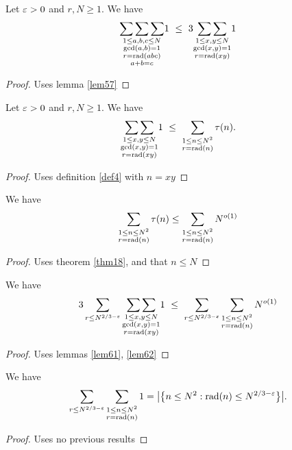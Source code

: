 \begin{lemma} \label{lem60} 
Let $\varepsilon>0$ and $r,N\ge1$. We have
\[
\underset{\substack{1\le a,b,c\le N\\ \gcd(a,b)=1\\ r=\operatorname{rad}(abc) \\ a+b=c}}{\sum\sum\sum} 1
\ \le \ 3\underset{\substack{1\le x,y\le N\\ \gcd(x,y)=1\\r=\operatorname{rad}(xy)}}{\sum\sum} 1
\]
\end{lemma}
\begin{proof}\leanok
{}
Uses lemma \ref{lem57}
\end{proof}

\begin{lemma} \label{lem61} 
Let $\varepsilon>0$ and $r,N\ge1$. We have
\[
\underset{\substack{1\le x,y\le N\\ \gcd(x,y)=1\\r=\operatorname{rad}(xy)}}{\sum\sum} 1 
\ \le \ \sum_{\substack{1\le n\le N^2\\r=\operatorname{rad}(n)}} \tau(n).
\]
\end{lemma}
\begin{proof}\leanok
{}
Uses definition \ref{def4} with $n=xy$
\end{proof}

\begin{lemma} \label{lem62} 
We have
\[
\sum_{\substack{1\le n\le N^2\\r=\operatorname{rad}(n)}} \tau(n)
\le \sum_{\substack{1\le n\le N^2\\r=\operatorname{rad}(n)}} N^{o(1)}
\]
\end{lemma}
\begin{proof}\leanok
{}
Uses theorem \ref{thm18}, and that $n\le N$
\end{proof}

\begin{lemma} \label{lem63} 
We have
\[
3\sum_{r\le N^{2/3-\varepsilon}}\underset{\substack{1\le x,y\le N\\ \gcd(x,y)=1\\r=\operatorname{rad}(xy)}}{\sum\sum} 1 
\ \le \ \sum_{r\le N^{2/3-\varepsilon}}\sum_{\substack{1\le n\le N^2\\r=\operatorname{rad}(n)}} N^{o(1)}
\]
\end{lemma}
\begin{proof}\leanok
{}
Uses lemmas \ref{lem61}, \ref{lem62}
\end{proof}

\begin{lemma} \label{lem64} 
We have
\[
\sum_{r\le N^{2/3-\varepsilon}}\sum_{\substack{1\le n\le N^2\\r=\operatorname{rad}(n)}}1 = \big|\big\{n\le N^2 : \operatorname{rad}(n) \le N^{2/3-\varepsilon}\big\}\big|.
\]
\end{lemma}
\begin{proof}\leanok
\uses{}
Uses no previous results
\end{proof}


